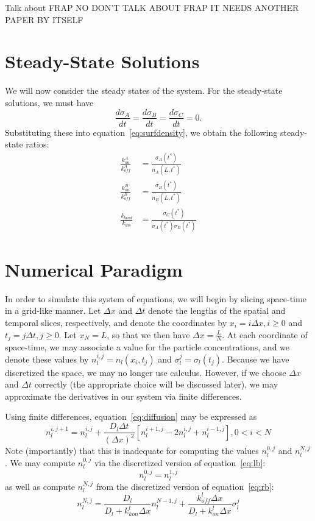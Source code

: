 \documentclass[aps, prl, preprint]{revtex4-1}
\begin{document}
\color{red}Talk about FRAP\normalcolor \color{blue} NO DON'T TALK ABOUT FRAP IT NEEDS ANOTHER PAPER BY ITSELF\normalcolor

\section{Steady-State Solutions}

We will now consider the steady states of the system. For the steady-state solutions, we must have $$\frac{d\sigma_A}{dt}=\frac{d\sigma_B}{dt}=\frac{d\sigma_C}{dt}=0.$$ Substituting these into equation~\ref{eq:surfdensity}, we obtain the following steady-state ratios:
\begin{subequations}\label{eq:ss}
\begin{align}
\frac{k_{on}^A}{k_{off}^A} &= \frac{\sigma_A(t^*)}{n_A(L, t^*)}\\
\frac{k_{on}^B}{k_{off}^B} &= \frac{\sigma_B(t^*)}{n_B(L, t^*)}\\
\frac{k_{bind}}{k_{dis}} &= \frac{\sigma_C(t^*)}{\sigma_A(t^*)\sigma_B(t^*)}
\end{align}
\end{subequations}

\section{Numerical Paradigm}

In order to simulate this system of equations, we will begin by slicing space-time in a grid-like manner. Let $\Delta x$ and $\Delta t$ denote the lengths of the spatial and temporal slices, respectively, and denote the coordinates by $x_i = i\Delta x, i\geq 0$ and $t_j = j\Delta t, j\geq 0$. Let $x_N = L$, so that we then have $\Delta x = \frac{L}{N}$. At each coordinate of space-time, we may associate a value for the particle concentrations, and we denote these values by $n_l^{i,j} = n_l(x_i, t_j)$ and $\sigma_l^j = \sigma_l(t_j)$. Because we have discretized the space, we may no longer use calculus. However, if we choose $\Delta x$ and $\Delta t$ correctly (the appropriate choice will be discussed later), we may approximate the derivatives in our system via finite differences.

Using finite differences, equation~\ref{eq:diffusion} may be expressed as
\begin{equation}\label{eq:disdiff}
n_l^{i,j+1} = n_l^{i,j} + \dfrac{D_l\Delta t}{(\Delta x)^2}\left [n_l^{i+1,j}-2n_l^{i,j}+n_l^{i-1,j}\right ], 0 < i < N
\end{equation}
Note (importantly) that this is inadequate for computing the values $n_l^{0,j}$ and $n_l^{N,j}$. We may compute $n_l^{0,j}$ via the discretized version of equation~\ref{eq:lb}:
\begin{equation}\label{eq:dislb}
n_l^{0,j} = n_l^{1,j}
\end{equation}
as well as compute $n_l^{N,j}$ from the discretized version of equation~\ref{eq:rb}:
\begin{equation}\label{eq:disrb}
n_l^{N,j} = \dfrac{D_l}{D_l+k_{kon}^l\Delta x}n_l^{N-1,j} +\dfrac{k_{off}^l\Delta x}{D_l+k_{on}^l\Delta x}\sigma_l^j
\end{equation}
\end{document}
